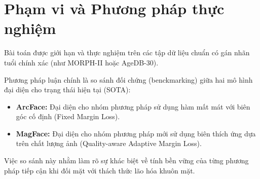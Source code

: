 \section{Phạm vi và Phương pháp thực nghiệm}
Bài toán được giới hạn và thực nghiệm trên các tập dữ liệu chuẩn có gán nhãn tuổi chính xác (như MORPH-II hoặc AgeDB-30). 

Phương pháp luận chính là so sánh đối chứng (benckmarking) giữa hai mô hình đại diện cho trạng thái hiện tại (SOTA):
\begin{itemize}
    \item \textbf{ArcFace:} Đại diện cho nhóm phương pháp sử dụng hàm mất mát với biên góc cố định (Fixed Margin Loss).
    \item \textbf{MagFace:} Đại diện cho nhóm phương pháp mới sử dụng biên thích ứng dựa trên chất lượng ảnh (Quality-aware Adaptive Margin Loss).
\end{itemize}
Việc so sánh này nhằm làm rõ sự khác biệt về tính bền vững của từng phương pháp tiếp cận khi đối mặt với thách thức lão hóa khuôn mặt.
